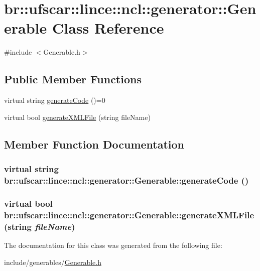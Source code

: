 \hypertarget{classbr_1_1ufscar_1_1lince_1_1ncl_1_1generator_1_1Generable}{
\section{br::ufscar::lince::ncl::generator::Generable Class Reference}
\label{classbr_1_1ufscar_1_1lince_1_1ncl_1_1generator_1_1Generable}
}


{\ttfamily \#include $<$Generable.h$>$}

\subsection*{Public Member Functions}
\begin{DoxyCompactItemize}
\item 
virtual string \hyperlink{classbr_1_1ufscar_1_1lince_1_1ncl_1_1generator_1_1Generable_a128413c1285bb48c23fdaf8356cc68be}{generateCode} ()=0
\item 
virtual bool \hyperlink{classbr_1_1ufscar_1_1lince_1_1ncl_1_1generator_1_1Generable_a9e4266c82d1c2f398ad14c55354f0146}{generateXMLFile} (string fileName)
\end{DoxyCompactItemize}


\subsection{Member Function Documentation}
\hypertarget{classbr_1_1ufscar_1_1lince_1_1ncl_1_1generator_1_1Generable_a128413c1285bb48c23fdaf8356cc68be}{
\subsubsection[{generateCode}]{\setlength{\rightskip}{0pt plus 5cm}virtual string br::ufscar::lince::ncl::generator::Generable::generateCode ()}}
\label{classbr_1_1ufscar_1_1lince_1_1ncl_1_1generator_1_1Generable_a128413c1285bb48c23fdaf8356cc68be}
\hypertarget{classbr_1_1ufscar_1_1lince_1_1ncl_1_1generator_1_1Generable_a9e4266c82d1c2f398ad14c55354f0146}{
\subsubsection[{generateXMLFile}]{\setlength{\rightskip}{0pt plus 5cm}virtual bool br::ufscar::lince::ncl::generator::Generable::generateXMLFile (string {\em fileName})}}
\label{classbr_1_1ufscar_1_1lince_1_1ncl_1_1generator_1_1Generable_a9e4266c82d1c2f398ad14c55354f0146}


The documentation for this class was generated from the following file:\begin{DoxyCompactItemize}
\item 
include/generables/\hyperlink{Generable_8h}{Generable.h}\end{DoxyCompactItemize}
